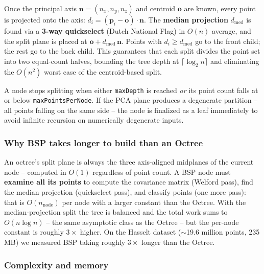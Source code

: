 \documentclass[12pt,a4paper]{article}
\begin{document}
Once the principal axis $\mathbf{n} = (n_x, n_y, n_z)$ and centroid
$\mathbf{o}$ are known, every point is projected onto the axis:
$d_i = (\mathbf{p}_i - \mathbf{o}) \cdot \mathbf{n}$.
The \textbf{median projection} $d_{\text{med}}$ is found via a
\textbf{3-way quickselect} (Dutch National Flag) in $O(n)$ average, and the
split plane is placed at $\mathbf{o} + d_{\text{med}}\,\mathbf{n}$.
Points with $d_i \geq d_{\text{med}}$ go to the front child; the rest go to
the back child. This guarantees that each split divides the point set into two
equal-count halves, bounding the tree depth at $\lceil \log_2 n \rceil$ and
eliminating the $O(n^2)$ worst case of the centroid-based split.

A node stops splitting when either \texttt{maxDepth} is reached \emph{or} its
point count falls at or below \texttt{maxPointsPerNode}. If the PCA plane
produces a degenerate partition -- all points falling on the same side -- the
node is finalized as a leaf immediately to avoid infinite recursion on
numerically degenerate inputs.

\subsubsection*{Why BSP takes longer to build than an Octree}

An octree's split plane is always the three axis-aligned midplanes of the
current node -- computed in $O(1)$ regardless of point count. A BSP node
must \textbf{examine all its points} to compute the covariance matrix (Welford
pass), find the median projection (quickselect pass), and classify points
(one more pass): that is $O(n_\text{node})$ per node with a larger constant
than the Octree. With the median-projection split the tree is balanced and the
total work sums to $O(n \log n)$ -- the same asymptotic class as the Octree --
but the per-node constant is roughly $3\times$ higher. On the Hasselt dataset
($\sim$19.6 million points, 235\,MB) we measured BSP taking roughly $3\times$
longer than the Octree.

\subsubsection*{Complexity and memory}
\end{document}
